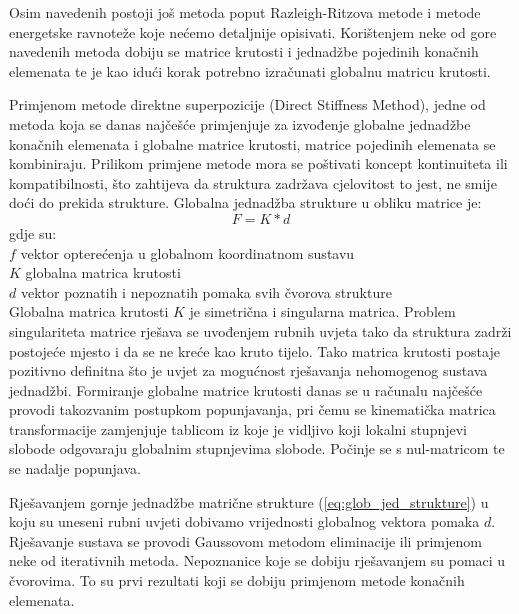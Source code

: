 \documentclass[a4paper,twoside,12pt]{memoir} %
\begin{document}
Osim navedenih postoji još metoda poput Razleigh-Ritzova metode i metode energetske ravnoteže koje nećemo detaljnije opisivati. Korištenjem neke od gore navedenih metoda dobiju se matrice krutosti i jednadžbe pojedinih konačnih elemenata te je kao idući korak potrebno izračunati globalnu matricu krutosti. \par

Primjenom metode direktne superpozicije (Direct Stiffness Method), jedne od metoda koja se danas najčešće primjenjuje za izvođenje globalne jednadžbe konačnih elemenata i globalne matrice krutosti, matrice pojedinih elemenata se kombiniraju. Prilikom primjene metode mora se poštivati koncept kontinuiteta ili kompatibilnosti, što zahtijeva da struktura zadržava cjelovitost to jest, ne smije doći do prekida strukture. Globalna jednadžba strukture u obliku matrice je:
\begin{equation}
\label{eq:glob_jed_strukture}
	F = K * d
\end{equation}
gdje su: \\
$f$ vektor opterećenja u globalnom koordinatnom sustavu \\
$K$ globalna matrica krutosti \\
$d$ vektor poznatih i nepoznatih pomaka svih čvorova strukture \\

Globalna matrica krutosti $K$ je simetrična i singularna matrica. Problem singulariteta matrice rješava se uvođenjem rubnih uvjeta tako da struktura zadrži postojeće mjesto i da se ne kreće kao kruto tijelo. Tako matrica krutosti postaje pozitivno definitna što je uvjet za mogućnost rješavanja nehomogenog sustava jednadžbi.
Formiranje globalne matrice krutosti danas se u računalu najčešće provodi takozvanim postupkom popunjavanja, pri čemu se kinematička matrica transformacije zamjenjuje tablicom iz koje je vidljivo koji lokalni stupnjevi slobode odgovaraju globalnim stupnjevima slobode. Počinje se s nul-matricom te se nadalje popunjava. \par

Rješavanjem gornje jednadžbe matrične strukture (\ref{eq:glob_jed_strukture}) u koju su uneseni rubni uvjeti dobivamo vrijednosti globalnog vektora pomaka $d$. Rješavanje sustava se provodi Gaussovom metodom eliminacije ili primjenom neke od iterativnih metoda. Nepoznanice koje se dobiju rješavanjem su pomaci u čvorovima. To su prvi rezultati koji se dobiju primjenom metode konačnih elemenata. \par
\end{document}
